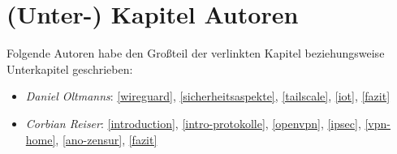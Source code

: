 \documentclass[assignment]{naklatex}
\begin{document}
    \hypersetup{pageanchor=false}
    
    

    \maketitle
    
    \hypersetup{pageanchor=true}
    \pagestyle{scrheadings}
    \frontmatter
    
    

    \clearpage
    \tableofcontents
    
    \printglossaries
    \clearpage
    \conditionalLoF
    \conditionalLoT
    \conditionalLoL

    \setcounter{figure}{0}
    
    \mainmatter

    
    
    
    
    
    
    \backmatter
    \printbibliography[title=Literaturverzeichnis]

    \chapter*{(Unter-) Kapitel Autoren}

    Folgende Autoren habe den Großteil der verlinkten Kapitel beziehungsweise Unterkapitel geschrieben:
    
    \begin{itemize}
        \item \textit{Daniel Oltmanns}: \ref{wireguard}, \ref{sicherheitsaspekte}, \ref{tailscale}, \ref{iot}, \ref{fazit}
        \item \textit{Corbian Reiser}: \ref{introduction}, \ref{intro-protokolle}, \ref{openvpn}, \ref{ipsec}, \ref{vpn-home}, \ref{ano-zensur}, \ref{fazit} 
    \end{itemize}

    \clearpage
    \appendix
    

    \finishWork
    
\end{document}
